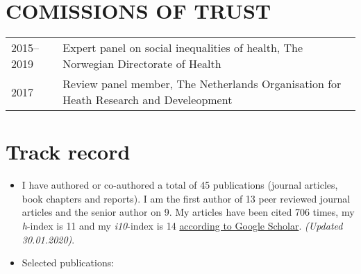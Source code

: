 \documentclass[11pt,a4paper,a4paper]{article}
\providecommand{\tightlist}{%
  \setlength{\itemsep}{0pt}\setlength{\parskip}{0pt}}
\newcounter{papers}
\begin{document}
\hypertarget{comissions-of-trust}{%
\section{COMISSIONS OF TRUST}\label{comissions-of-trust}}

\begin{tabular}{ll}
  2015--2019 & Expert panel on social inequalities of health, The Norwegian Directorate of Health \\ 
  2017 & Review panel member, The Netherlands Organisation for Heath Research and Develeopment \\ 
  \end{tabular}

\hypertarget{track-record}{%
\section{Track record}\label{track-record}}

\begin{itemize}
\tightlist
\item
  I have authored or co-authored a total of 45 publications (journal articles, book chapters and reports). I am the first author of 13 peer reviewed journal articles and the senior author on 9. My articles have been cited 706 times, my \emph{h}-index is 11 and my \emph{i10}-index is 14 \href{https://scholar.google.com/citations?user=TMC38ZgAAAAJ\&hl=en}{according to Google Scholar}. \emph{(Updated 30.01.2020)}.
\item
  Selected publications:
  \newrefcontext[sorting=none]\setcounter{papers}{0}\pagebreak[3]\printbibliography[category=bib-/Users/st06810/Dropbox/AkademiskCV/tpubs_zot.bib-4137897,heading=none]\setcounter{papers}{0}
\end{itemize}

\nocite{BoeSocioeconomicstatuschildren2012,
BoeSocioeconomicstatuschild2014,
BoeInterplaySubjectiveObjective2019a,
BoeCumulativeeffectsnegative2017,
BoeEconomicvolatilitychildhood2017,
Arntzen29recommendationscombat2019,
BoeFinancialdifficultieschildhood2017,
Boestrengthsdifficultiesquestionnaire2016,
SmidMeasurementEquivalenceConvergent2018,
BoeSosiookonomiskstatusog2015}
\end{document}
